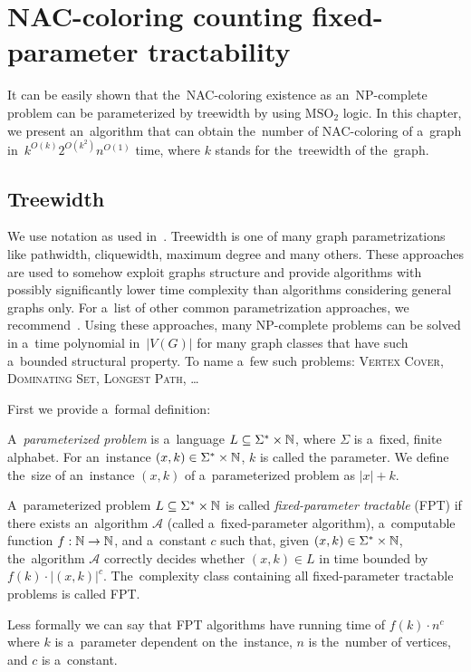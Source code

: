 
\chapter{NAC-coloring counting fixed-parameter tractability}%
\label{chapter:fpt}

\begin{chapterabstract}

	It can be easily shown that the~NAC-coloring existence as an~NP-complete
	problem can be parameterized by treewidth by using \( \text{MSO}_2 \) logic.
	In this chapter, we present an~algorithm that can obtain
	the~number of NAC-coloring of a~graph in~\({k}^{O(k)} 2^{O(k^2)} n^{O(1)}\) time,
	where \(k\) stands for the~treewidth of the~graph.

\end{chapterabstract}

\section{Treewidth}

We use notation as used in~\cite{book_parametrized_algorithms}.
Treewidth is one of many graph parametrizations like
pathwidth, cliquewidth, maximum degree and many others.
These approaches are used to somehow exploit graphs structure
and provide algorithms with possibly significantly lower time complexity
than algorithms considering general graphs only.
For a~list of other common parametrization approaches,
we recommend~\cite{tree_width_comparision_other_classes}.
Using these approaches, many NP-complete problems can be solved
in a~time polynomial in~\( |V(G)| \)
for many graph classes that have such a~bounded structural property.
To name a~few such problems:
\textsc{Vertex Cover}, \textsc{Dominating Set}, \textsc{Longest Path}, \dots

First we provide a~formal definition:
%
\begin{definition}
	A~\emph{parameterized problem} is a~language \( L \subseteq \Sigma^* \times \mathbb{N} \), where
	\( \Sigma \) is a~fixed, finite alphabet. For an~instance \( (x, k) \in \Sigma^* \times \mathbb{N} \), \( k \) is called the
	parameter.
	We define the~size of an~instance \( (x, k) \) of a~parameterized problem as \( |x| + k \).
\end{definition}
%
\begin{definition}
	A~parameterized problem \( L \subseteq \Sigma^* \times \mathbb{N} \) is called \emph{fixed-parameter tractable} (FPT)
	if there exists an~algorithm \( \mathcal{A} \) (called a~fixed-parameter
	algorithm), a~computable function \( f: \mathbb{N} \to \mathbb{N} \), and a~constant
	\( c \) such that, given \( (x, k) \in \Sigma^* \times \mathbb{N} \), the~algorithm \( \mathcal{A} \)
	correctly decides
	whether \( (x, k) \in L \) in time bounded by \( f(k) \cdot |(x, k)|^c \). The~complexity
	class containing all fixed-parameter tractable problems is called FPT\@.
\end{definition}
%
Less formally we can say that FPT algorithms
have running time of \( f(k)\cdot n^c \)
where \( k \) is a~parameter dependent on the~instance,
\( n \) is the~number of vertices,
and \( c \) is a~constant.

